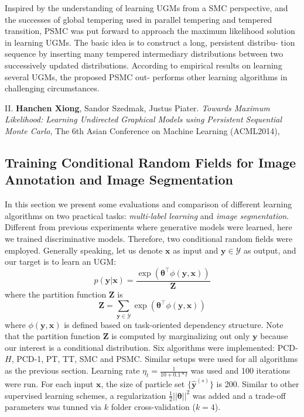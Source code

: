 Inspired by the understanding of learning UGMs from a SMC perspective, and the successes of global
tempering used in parallel tempering and tempered transition, PSMC was put forward to approach the
maximum likelihood solution in learning UGMs. The basic idea is to construct a long, persistent distribu-
tion sequence by inserting many tempered intermediary distributions between two successively updated
distributions. According to empirical results on learning several UGMs, the proposed PSMC out-
performs other learning algorithms in challenging circumstances.


\begin{shaded}
{\Huge II.} \textbf{Hanchen Xiong}, Sandor Szedmak, Justus Piater. {\it Towards Maximum Likelihood: Learning Undirected Graphical Models using Persistent Sequential Monte Carlo}, The 6th Asian Conference on Machine Learning (ACML2014), 
\end{shaded}


\subsection {Training Conditional Random Fields for Image Annotation and Image Segmentation}
In this section we present some evaluations and comparison of different learning algorithms on two practical tasks: \emph{multi-label learning} and \emph{image 
segmentation}. Different from previous experiments where generative models were learned, here we trained discriminative models. Therefore, two 
conditional random fields were employed. Generally speaking, let us denote $\mathbf{x}$ as input and $\mathbf{y}\in \mathcal{Y}$ as output, and our target is to 
learn an UGM:  
\begin{equation}
	p(\mathbf{y}|\mathbf{x})=\frac{\exp(\boldsymbol{\theta}^\top \phi(\mathbf{y},\mathbf{x}))}{\mathbf{Z}}
\end{equation}
where the partition function $\mathbf{Z}$ is
\begin{equation}
	\mathbf{Z}=\sum_{\mathbf{y}\in\mathcal{Y}}\exp(\boldsymbol{\theta}^\top \phi(\mathbf{y},\mathbf{x}))
\end{equation}
where $\phi(\mathbf{y},\mathbf{x})$ is defined based on task-oriented dependency structure. Note that the partition function $\mathbf{Z}$ is computed by 
marginalizing out only $\mathbf{y}$ because our interest is a conditional distribution. Six algorithms 
were implemented: PCD-$H$, PCD-1, PT, TT, SMC and PSMC. Similar setups were used for all algorithms as the previous section.  
Learning rate $\eta_t=\frac{1}{10+0.1*t}$ was used and 100 iterations were run. For each input $\mathbf{x}$, 
the size of particle set $\{ \hat{\mathbf{y}}^{(s)}\}$ is 200.  Similar to other supervised learning schemes, a regularization $\frac{1}{2}||\boldsymbol{\theta}||^2$ 
was added and a trade-off parameters was tunned via $k$ folder cross-validation ($k=4$).  

